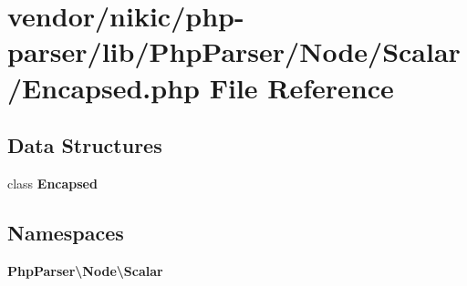 \section{vendor/nikic/php-\/parser/lib/\+Php\+Parser/\+Node/\+Scalar/\+Encapsed.php File Reference}
\label{_encapsed_8php}
\subsection*{Data Structures}
\begin{DoxyCompactItemize}
\item 
class {\bf Encapsed}
\end{DoxyCompactItemize}
\subsection*{Namespaces}
\begin{DoxyCompactItemize}
\item 
 {\bf Php\+Parser\textbackslash{}\+Node\textbackslash{}\+Scalar}
\end{DoxyCompactItemize}

